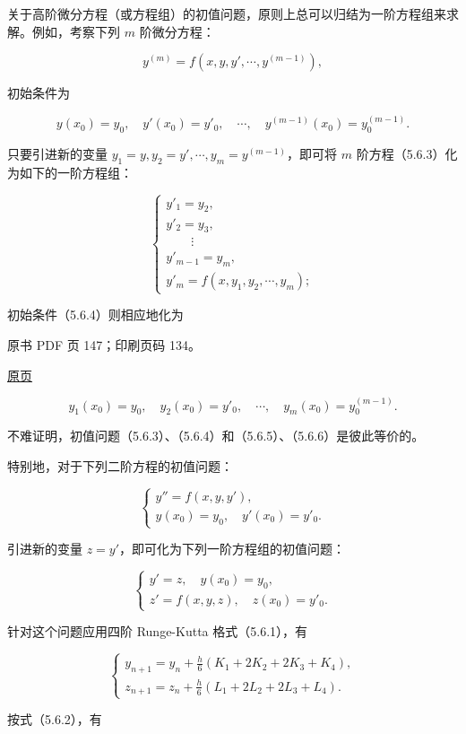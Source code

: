 关于高阶微分方程（或方程组）的初值问题，原则上总可以归结为一阶方程组来求解。例如，考察下列 \(m\) 阶微分方程：

\[
y^{(m)}=f(x,y,y',\cdots,y^{(m-1)}),
\tag{5.6.3}
\]

初始条件为

\[
y(x_0)=y_0,\quad y'(x_0)=y'_0,\quad\cdots,\quad y^{(m-1)}(x_0)=y_0^{(m-1)}.
\tag{5.6.4}
\]

只要引进新的变量 \(y_1=y,y_2=y',\cdots,y_m=y^{(m-1)}\)，即可将 \(m\) 阶方程（5.6.3）化为如下的一阶方程组：

\[
\begin{cases}
y'_1=y_2,\\
y'_2=y_3,\\
\qquad\vdots\\
y'_{m-1}=y_m,\\
y'_m=f(x,y_1,y_2,\cdots,y_m);
\end{cases}
\tag{5.6.5}
\]

初始条件（5.6.4）则相应地化为

\clearpage

原书 PDF 页 147；印刷页码 134。

\href{source-images/pdf-147.jpeg}{原页}

\[
y_1(x_0)=y_0,\quad y_2(x_0)=y'_0,\quad\cdots,\quad y_m(x_0)=y_0^{(m-1)}.
\tag{5.6.6}
\]

不难证明，初值问题（5.6.3）、（5.6.4）和（5.6.5）、（5.6.6）是彼此等价的。

特别地，对于下列二阶方程的初值问题：

\[
\begin{cases}
y''=f(x,y,y'),\\
y(x_0)=y_0,\quad y'(x_0)=y'_0.
\end{cases}
\]

引进新的变量 \(z=y'\)，即可化为下列一阶方程组的初值问题：

\[
\begin{cases}
y'=z,\quad y(x_0)=y_0,\\
z'=f(x,y,z),\quad z(x_0)=y'_0.
\end{cases}
\]

针对这个问题应用四阶 Runge-Kutta 格式（5.6.1），有

\[
\begin{cases}
\displaystyle y_{n+1}=y_n+\frac h6(K_1+2K_2+2K_3+K_4),\\[6pt]
\displaystyle z_{n+1}=z_n+\frac h6(L_1+2L_2+2L_3+L_4).
\end{cases}
\]

按式（5.6.2），有

